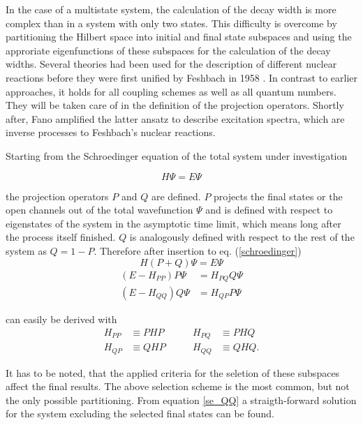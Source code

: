 In the case of a multistate system, the calculation of the decay width is more
complex than in a system with only two states.
This difficulty is overcome by partitioning the Hilbert space into initial and final
state subspaces and using the approriate eigenfunctions of these subspaces for the
calculation of the decay widths. 
Several theories had been used for the description of different nuclear reactions
before they were first unified by Feshbach in 1958 \cite{Feshbach58,Feshbach62,Feshbach_book}.
In contrast to earlier approaches, it holds for all coupling schemes as well as
all quantum numbers. They will be taken care of in the definition of the
projection operators.
Shortly after,
Fano amplified the latter ansatz to describe excitation spectra, which
are inverse processes to Feshbach's nuclear reactions.\cite{Fano61}


Starting from the Schroedinger equation of the total system under investigation

\begin{equation}
  H \Psi = E \Psi \label{schroedinger}
\end{equation}

the projection operators $P$ and $Q$ are defined. $P$ projects the final states
or the open channels out
of the total wavefunction $\Psi$ and is defined with respect to eigenstates
of the system in the asymptotic time limit, which means long after the process
itself finished. $Q$ is analogously defined with respect to the rest of the
system as $Q = 1 - P$. Therefore after insertion to eq. (\ref{schroedinger})
\begin{equation}
  H (P+Q) \Psi = E \Psi
\end{equation}
\begin{align}
  (E - H_{PP}) P \Psi & = H_{PQ} Q \Psi \label{se_PP}\\
  (E - H_{QQ}) Q \Psi & = H_{QP} P \Psi \label{se_QQ}
\end{align}

can easily be derived with
\begin{align*}
  H_{PP} & \equiv PHP & \quad\quad H_{PQ} & \equiv PHQ\\
  H_{QP} & \equiv QHP & \quad\quad H_{QQ} & \equiv QHQ .
\end{align*}

It has to be noted, that the applied criteria for the seletion of
these subspaces affect the final results. The above selection scheme is the
most common, but not the only possible partitioning.
From equation \ref{se_QQ} a straigth-forward solution for the system excluding
the selected final states can be found.


